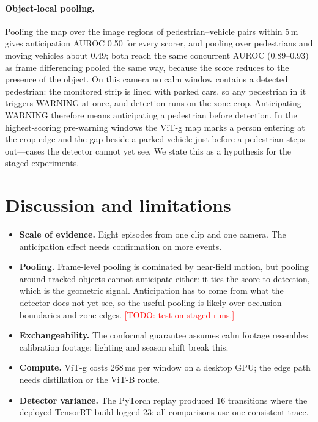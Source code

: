 \documentclass[11pt]{article}
\newcommand{\todo}[1]{\textcolor{red}{[TODO: #1]}}
\begin{document}
\paragraph{Object-local pooling.} Pooling the map over the image regions of
pedestrian--vehicle pairs within 5\,m gives anticipation AUROC 0.50 for every
scorer, and pooling over pedestrians and moving vehicles about 0.49; both reach
the same concurrent AUROC (0.89--0.93) as frame differencing pooled the same
way, because the score reduces to the presence of the object. On this camera
no calm window contains a detected pedestrian: the monitored strip is lined
with parked cars, so any pedestrian in it triggers WARNING at once, and
detection runs on the zone crop. Anticipating WARNING therefore means
anticipating a pedestrian before detection. In the highest-scoring pre-warning
windows the ViT-g map marks a person entering at the crop edge and the gap
beside a parked vehicle just before a pedestrian steps out---cases the detector
cannot yet see. We state this as a hypothesis for the staged experiments.

\section{Discussion and limitations}

\begin{itemize}
  \item \textbf{Scale of evidence.} Eight episodes from one clip and one camera.
        The anticipation effect needs confirmation on more events.
  \item \textbf{Pooling.} Frame-level pooling is dominated by near-field motion,
        but pooling around tracked objects cannot anticipate either: it ties the
        score to detection, which is the geometric signal. Anticipation has to
        come from what the detector does not yet see, so the useful pooling is
        likely over occlusion boundaries and zone edges. \todo{test on staged runs.}
  \item \textbf{Exchangeability.} The conformal guarantee assumes calm footage
        resembles calibration footage; lighting and season shift break this.
  \item \textbf{Compute.} ViT-g costs 268\,ms per window on a desktop GPU; the
        edge path needs distillation or the ViT-B route.
  \item \textbf{Detector variance.} The PyTorch replay produced 16 transitions
        where the deployed TensorRT build logged 23; all comparisons use one
        consistent trace.
\end{itemize}
\end{document}
